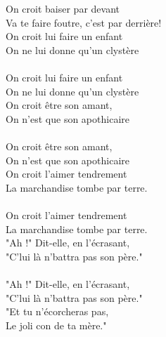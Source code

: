 {\\\\On croit baiser par devant
\\Va te faire foutre, c'est par derrière!
\\On croit lui faire un enfant
\\On ne lui donne qu'un clystère
\\\\On croit lui faire un enfant
\\On ne lui donne qu'un clystère
\\On croit être son amant,
\\On n'est que son apothicaire
\\\\On croit être son amant,
\\On n'est que son apothicaire
\\On croit l'aimer tendrement
\\La marchandise tombe par terre.
\\\\On croit l'aimer tendrement
\\La marchandise tombe par terre.
\\"Ah !" Dit-elle, en l’écrasant,
\\"C’lui là n’battra pas son père."
\\\\"Ah !" Dit-elle, en l’écrasant,
\\"C’lui là n’battra pas son père."
\\"Et tu n’écorcheras pas,
\\Le joli con de ta mère."
}

\breakpage